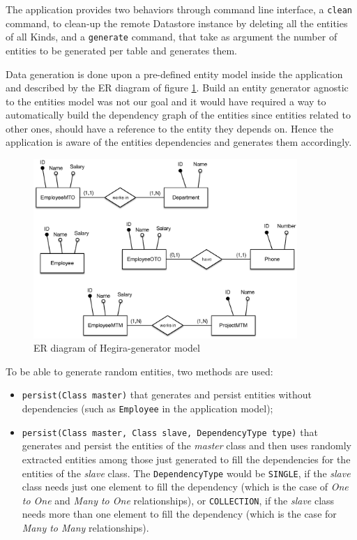 \noindent The application provides two behaviors through command line interface, a \texttt{clean} command, to clean-up the remote Datastore instance by deleting all the entities of all Kinds, and a \texttt{generate} command, that take as argument the number of entities to be generated per table and generates them.

\newparagraph Data generation is done upon a pre-defined entity model inside the application and described by the ER diagram of figure \ref{fig:hegira-generator-er}.
Build an entity generator agnostic to the entities model was not our goal and it would have required a way to automatically build the dependency graph of the entities since entities related to other ones, should have a reference to the entity they depends on. Hence the application is aware of the entities dependencies and generates them accordingly.

\begin{figure}[tbh]
  \centering
  \includegraphics[width=10cm]{images/hegira_generator_er}
  \caption{ER diagram of Hegira-generator model}
  \label{fig:hegira-generator-er}
\end{figure} 

\noindent To be able to generate random entities, two methods are used:
\begin{itemize}
\item \texttt{persist(Class master)} that generates and persist entities without dependencies (such as \texttt{Employee} in the application model);
\item \texttt{persist(Class master, Class slave, DependencyType type)} that generates and persist the entities of the \textit{master} class and then uses randomly extracted entities among those just generated to fill the dependencies for the entities of the \textit{slave} class.
The \texttt{DependencyType} would be \texttt{SINGLE}, if the \textit{slave} class needs just one element to fill the dependency (which is the case of \textit{One to One} and \textit{Many to One} relationships), or \texttt{COLLECTION}, if the \textit{slave} class needs more than one element to fill the dependency (which is the case for \textit{Many to Many} relationships).
\end{itemize}

